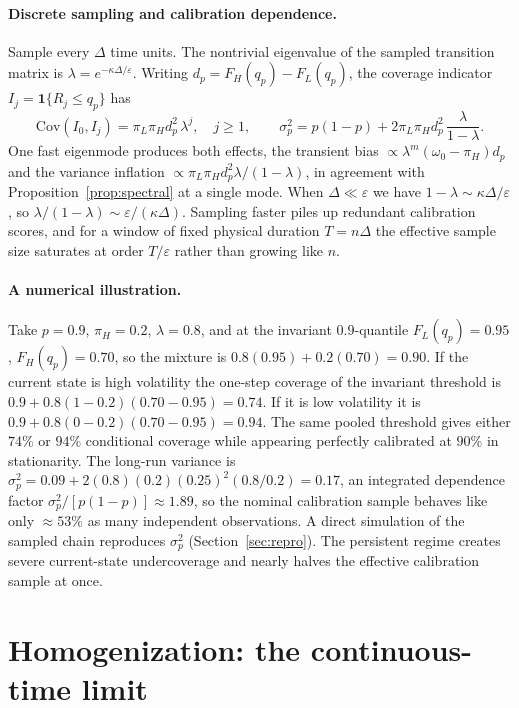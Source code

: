 \documentclass[11pt]{article}
\theoremstyle{definition}
\theoremstyle{remark}
\newcommand{\Cov}{\mathrm{Cov}}
\newcommand{\one}{\mathbf{1}}
\begin{document}
\paragraph{Discrete sampling and calibration dependence.} Sample every $\Delta$ time units.
The nontrivial eigenvalue of the sampled transition matrix is $\lambda=e^{-\kappa\Delta/
\varepsilon}$. Writing $d_p=F_H(q_p)-F_L(q_p)$, the coverage indicator
$I_j=\one\{R_j\le q_p\}$ has
\begin{equation}\label{eq:cov}
  \Cov(I_0,I_j) = \pi_L\pi_H d_p^2\,\lambda^{j},\quad j\ge1,
  \qquad
  \sigma_p^2 = p(1-p) + 2\pi_L\pi_H d_p^2\,\frac{\lambda}{1-\lambda} .
\end{equation}
One fast eigenmode produces both effects, the transient bias $\propto\lambda^{m}(\omega_0-
\pi_H)d_p$ and the variance inflation $\propto\pi_L\pi_H d_p^2\lambda/(1-\lambda)$, in
agreement with Proposition~\ref{prop:spectral} at a single mode. When $\Delta\ll\varepsilon$
we have $1-\lambda\sim\kappa\Delta/\varepsilon$, so $\lambda/(1-\lambda)\sim\varepsilon/
(\kappa\Delta)$. Sampling faster piles up redundant calibration scores, and for a window of
fixed physical duration $T=n\Delta$ the effective sample size saturates at order
$T/\varepsilon$ rather than growing like $n$.

\paragraph{A numerical illustration.} Take $p=0.9$, $\pi_H=0.2$, $\lambda=0.8$, and at the
invariant $0.9$-quantile $F_L(q_p)=0.95$, $F_H(q_p)=0.70$, so the mixture is
$0.8(0.95)+0.2(0.70)=0.90$. If the current state is high volatility the one-step coverage of
the invariant threshold is $0.9+0.8(1-0.2)(0.70-0.95)=0.74$. If it is low volatility it is
$0.9+0.8(0-0.2)(0.70-0.95)=0.94$. The same pooled threshold gives either $74\%$ or $94\%$
conditional coverage while appearing perfectly calibrated at $90\%$ in stationarity. The
long-run variance is $\sigma_p^2=0.09+2(0.8)(0.2)(0.25)^2(0.8/0.2)=0.17$, an integrated
dependence factor $\sigma_p^2/[p(1-p)]\approx1.89$, so the nominal calibration sample behaves
like only $\approx53\%$ as many independent observations. A direct simulation of the sampled
chain reproduces $\sigma_p^2$ (Section~\ref{sec:repro}). The persistent regime creates severe
current-state undercoverage and nearly halves the effective calibration sample at once.

\section{Homogenization: the continuous-time limit}\label{sec:homog}
\end{document}
